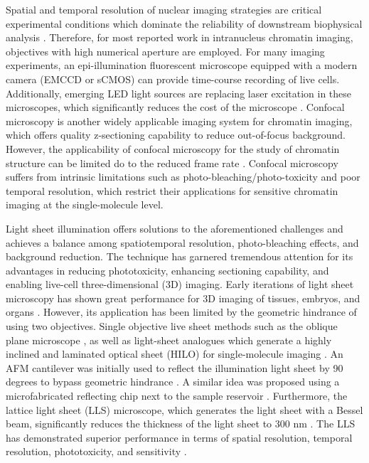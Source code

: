 Spatial and temporal resolution of nuclear imaging strategies are critical experimental conditions which dominate the reliability of downstream biophysical analysis \parencite{Burov2013}. Therefore, for most reported work in intranucleus chromatin imaging, objectives with high numerical aperture are employed. For many imaging experiments, an epi-illumination fluorescent microscope equipped with a modern camera (EMCCD or sCMOS) can provide time-course recording of live cells. Additionally, emerging LED light sources are replacing laser excitation in these microscopes, which significantly reduces the cost of the microscope \parencite{Albeanu2008,Hattori2009,Zheng2013}. Confocal microscopy is another widely applicable imaging system for chromatin imaging, which offers quality z-sectioning capability to reduce out-of-focus background. However, the applicability of confocal microscopy for the study of chromatin structure can be limited do to the reduced frame rate \parencite{Shukron2019}. Confocal microscopy suffers from intrinsic limitations such as photo-bleaching/photo-toxicity and poor temporal resolution, which restrict their applications for sensitive chromatin imaging at the single-molecule level.

Light sheet illumination offers solutions to the aforementioned challenges and achieves a balance among spatiotemporal resolution, photo-bleaching effects, and background reduction. The technique has garnered tremendous attention for its advantages in reducing phototoxicity, enhancing sectioning capability, and enabling live-cell three-dimensional (3D) imaging. Early iterations of light sheet microscopy has shown great performance for 3D imaging of tissues, embryos, and organs \parencite{Keller2015,Keller2010,Keller2008,Tomer2011}. However, its application has been limited by the geometric hindrance of using two objectives. Single objective live sheet methods such as the oblique plane microscope \parencite{Sapoznik2020}, as well as light-sheet analogues which generate a highly inclined and laminated optical sheet (HILO) for single-molecule imaging \parencite{Tokunaga2008}. An AFM cantilever was initially used to reflect the illumination light sheet by 90 degrees to bypass geometric hindrance \parencite{Gebhardt2013}. A similar idea was proposed using a microfabricated reflecting chip next to the sample reservoir \parencite{Galland2015}. Furthermore, the lattice light sheet (LLS) microscope, which generates the light sheet with a Bessel beam, significantly reduces the thickness of the light sheet to 300 nm \parencite{Chen2014}. The LLS has demonstrated superior performance in terms of spatial resolution, temporal resolution, phototoxicity, and sensitivity \parencite{Gao2019}.


